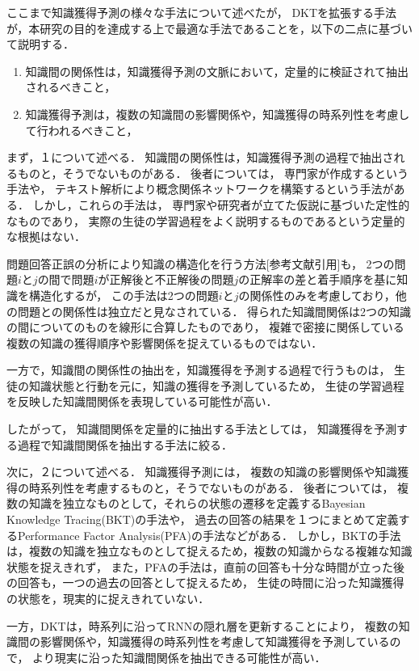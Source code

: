 ここまで知識獲得予測の様々な手法について述べたが，
DKTを拡張する手法が，本研究の目的を達成する上で最適な手法であることを，以下の二点に基づいて説明する．

\begin{enumerate}
	\item 知識間の関係性は，知識獲得予測の文脈において，定量的に検証されて抽出されるべきこと，
	\item 知識獲得予測は，複数の知識間の影響関係や，知識獲得の時系列性を考慮して行われるべきこと，
\end{enumerate}

まず，１について述べる．
知識間の関係性は，知識獲得予測の過程で抽出されるものと，そうでないものがある．
後者については，
専門家が作成するという手法や，
テキスト解析により概念関係ネットワークを構築するという手法\cite{chen2008mining}がある．
しかし，これらの手法は，
専門家や研究者が立てた仮説に基づいた定性的なものであり，
実際の生徒の学習過程をよく説明するものであるという定量的な根拠はない．

問題回答正誤の分析により知識の構造化を行う方法[参考文献引用]も，%
2つの問題$i$と$j$の間で問題$i$が正解後と不正解後の問題$j$の正解率の差と着手順序を基に知識を構造化するが，
この手法は2つの問題$i$と$j$の関係性のみを考慮しており，他の問題との関係性は独立だと見なされている．
得られた知識間関係は2つの知識の間についてのものを線形に合算したものであり，
複雑で密接に関係している複数の知識の獲得順序や影響関係を捉えているものではない．

一方で，知識間の関係性の抽出を，知識獲得を予測する過程で行うものは，
生徒の知識状態と行動を元に，知識の獲得を予測しているため，
生徒の学習過程を反映した知識間関係を表現している可能性が高い．

したがって，
知識間関係を定量的に抽出する手法としては，
知識獲得を予測する過程で知識間関係を抽出する手法に絞る．


次に，２について述べる．
知識獲得予測には，
複数の知識の影響関係や知識獲得の時系列性を考慮するものと，そうでないものがある．
後者については，
複数の知識を独立なものとして，それらの状態の遷移を定義するBayesian Knowledge Tracing(BKT)の手法や，
過去の回答の結果を１つにまとめて定義するPerformance Factor Analysis(PFA)の手法などがある．
しかし，BKTの手法は，複数の知識を独立なものとして捉えるため，複数の知識からなる複雑な知識状態を捉えきれず，
また，PFAの手法は，直前の回答も十分な時間が立った後の回答も，一つの過去の回答として捉えるため，
生徒の時間に沿った知識獲得の状態を，現実的に捉えきれていない．

一方，DKTは，時系列に沿ってRNNの隠れ層を更新することにより，
複数の知識間の影響関係や，知識獲得の時系列性を考慮して知識獲得を予測しているので，
より現実に沿った知識間関係を抽出できる可能性が高い．

